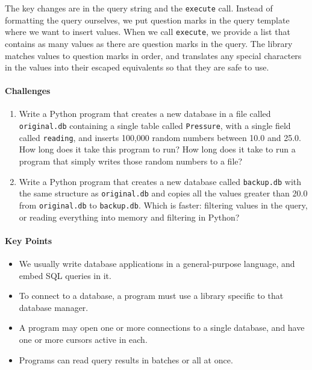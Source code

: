 \documentclass[]{book}
\begin{document}
The key changes are in the query string and the \texttt{execute} call.
Instead of formatting the query ourselves, we put question marks in the
query template where we want to insert values. When we call
\texttt{execute}, we provide a list that contains as many values as
there are question marks in the query. The library matches values to
question marks in order, and translates any special characters in the
values into their escaped equivalents so that they are safe to use.

\mbox{}\paragraph{Challenges}

\begin{enumerate}
\item
  Write a Python program that creates a new database in a file called
  \texttt{original.db} containing a single table called
  \texttt{Pressure}, with a single field called \texttt{reading}, and
  inserts 100,000 random numbers between 10.0 and 25.0. How long does it
  take this program to run? How long does it take to run a program that
  simply writes those random numbers to a file?
\item
  Write a Python program that creates a new database called
  \texttt{backup.db} with the same structure as \texttt{original.db} and
  copies all the values greater than 20.0 from \texttt{original.db} to
  \texttt{backup.db}. Which is faster: filtering values in the query, or
  reading everything into memory and filtering in Python?
\end{enumerate}

\mbox{}\paragraph{Key Points}

\begin{itemize}
\item
  We usually write database applications in a general-purpose language,
  and embed SQL queries in it.
\item
  To connect to a database, a program must use a library specific to
  that database manager.
\item
  A program may open one or more connections to a single database, and
  have one or more cursors active in each.
\item
  Programs can read query results in batches or all at once.
\end{itemize}
\end{document}

